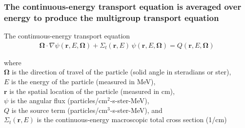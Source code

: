 \documentclass[compress,10pt]{beamer}
\renewcommand{\vec}[1]{\mathbf{#1}}
\newcommand{\om}{\boldsymbol{\Omega}}
\begin{document}
\typeout{***********************************************************************************}

\begin{frame}
   \frametitle{The continuous-energy transport equation is averaged over energy to produce the multigroup transport equation}

\begin{block}{The continuous-energy transport equation}
\vspace{-4mm}
\begin{align*}
\om \cdot \nabla \psi(\vec{r}, E, \om) + \Sigma_t(\vec{r}, E) \,\psi(\vec{r}, E, \om) = Q(\vec{r}, E, \om)
\end{align*}
\end{block}

{ \small
where \\
$\om$ is the direction of travel of the particle (solid angle in steradians or ster), \\
$E$ is the energy of the particle (measured in MeV), \\
$\vec{r}$ is the spatial location of the particle (measured in cm), \\
$\psi$ is the angular flux (particles/cm$^2$-s-ster-MeV), \\
$Q$ is the source term (particles/cm$^3$-s-ster-MeV), and \\
$\Sigma_t(\vec{r}, E)$ is the continuous-energy macroscopic total cross section (1/cm)\\
}

\end{frame}

\typeout{***********************************************************************************}
\end{document}
